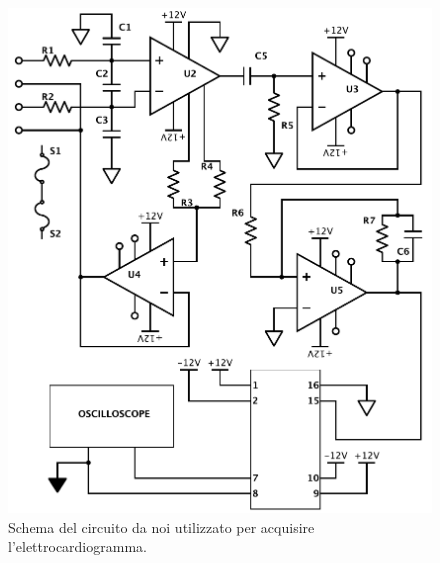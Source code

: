 \begin{figure}[tpc]
\centering
\includegraphics[width=.7\textwidth]{../E07/latex/circuito.pdf}
\caption{Schema del circuito da noi utilizzato per acquisire l'elettrocardiogramma.}
\label{cir8:compensation}
\end{figure}
